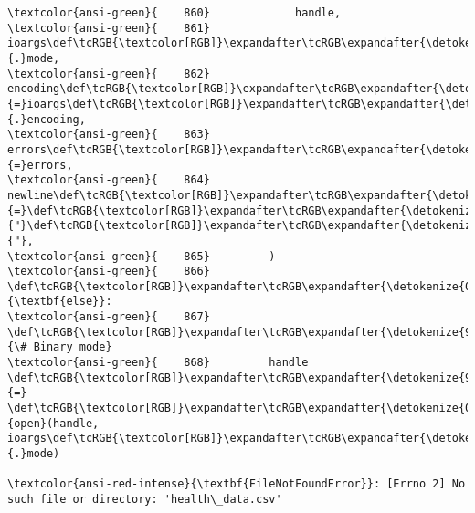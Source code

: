 \documentclass[11pt]{article}
\begin{document}
\begin{Verbatim}[commandchars=\\\{\}, frame=single, framerule=2mm, rulecolor=\color{outerrorbackground}]
\textcolor{ansi-green}{    860}             handle,
\textcolor{ansi-green}{    861}             ioargs\def\tcRGB{\textcolor[RGB]}\expandafter\tcRGB\expandafter{\detokenize{98,98,98}}{.}mode,
\textcolor{ansi-green}{    862}             encoding\def\tcRGB{\textcolor[RGB]}\expandafter\tcRGB\expandafter{\detokenize{98,98,98}}{=}ioargs\def\tcRGB{\textcolor[RGB]}\expandafter\tcRGB\expandafter{\detokenize{98,98,98}}{.}encoding,
\textcolor{ansi-green}{    863}             errors\def\tcRGB{\textcolor[RGB]}\expandafter\tcRGB\expandafter{\detokenize{98,98,98}}{=}errors,
\textcolor{ansi-green}{    864}             newline\def\tcRGB{\textcolor[RGB]}\expandafter\tcRGB\expandafter{\detokenize{98,98,98}}{=}\def\tcRGB{\textcolor[RGB]}\expandafter\tcRGB\expandafter{\detokenize{175,0,0}}{"}\def\tcRGB{\textcolor[RGB]}\expandafter\tcRGB\expandafter{\detokenize{175,0,0}}{"},
\textcolor{ansi-green}{    865}         )
\textcolor{ansi-green}{    866}     \def\tcRGB{\textcolor[RGB]}\expandafter\tcRGB\expandafter{\detokenize{0,135,0}}{\textbf{else}}:
\textcolor{ansi-green}{    867}         \def\tcRGB{\textcolor[RGB]}\expandafter\tcRGB\expandafter{\detokenize{95,135,135}}{\# Binary mode}
\textcolor{ansi-green}{    868}         handle \def\tcRGB{\textcolor[RGB]}\expandafter\tcRGB\expandafter{\detokenize{98,98,98}}{=} \def\tcRGB{\textcolor[RGB]}\expandafter\tcRGB\expandafter{\detokenize{0,135,0}}{open}(handle, ioargs\def\tcRGB{\textcolor[RGB]}\expandafter\tcRGB\expandafter{\detokenize{98,98,98}}{.}mode)

\textcolor{ansi-red-intense}{\textbf{FileNotFoundError}}: [Errno 2] No such file or directory: 'health\_data.csv'
    \end{Verbatim}
\end{document}
